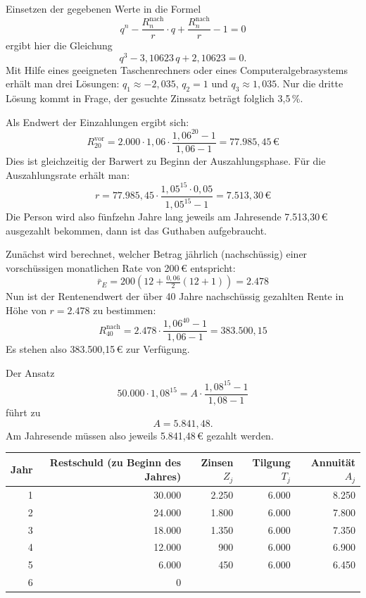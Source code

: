 Einsetzen der gegebenen Werte in die Formel
\[ q^n - \frac{R_n^{\text{nach}}}{r} \cdot q + \frac{R_n^{\text{nach}}}{r} - 1 = 0 \]
ergibt hier die Gleichung
\[ q^3 - 3{,}10623\,q + 2{,}10623 = 0 . \]
Mit Hilfe eines geeigneten Taschenrechners oder eines Computeralgebrasystems erhält man drei Lösungen: $q_1 \approx -2{,}035$, $q_2 = 1$ und $q_3 \approx 1{,}035$. Nur die dritte Lösung kommt in Frage, der gesuchte Zinssatz beträgt folglich 3{,}5\,\%.

Als Endwert der Einzahlungen ergibt sich:
\[ R_{20}^{\text{vor}} = 2.000 \cdot 1{,}06 \cdot \frac{1{,}06^{20} - 1}{1{,}06 - 1} = 77.985{,}45\,€ \]
Dies ist gleichzeitig der Barwert zu Beginn der Auszahlungsphase. Für die Auszahlungsrate erhält man:
\[ r = 77.985{,}45 \cdot \frac{1{,}05^{15} \cdot 0{,}05}{1{,}05^{15} - 1} = 7.513{,}30\,€ \]
Die Person wird also fünfzehn Jahre lang jeweils am Jahresende 7.513{,}30\,€ ausgezahlt bekommen, dann ist das Guthaben aufgebraucht.

Zunächst wird berechnet, welcher Betrag jährlich (nachschüssig) einer vorschüssigen monatlichen Rate von 200\,€ entspricht:
\[ \bar{r}_E = 200 \left(12 + \tfrac{0{,}06}{2}(12 + 1)\right) = 2.478 \]
Nun ist der Rentenendwert der über 40 Jahre nachschüssig gezahlten Rente in Höhe von $r = 2.478$ zu bestimmen:
\[ R_{40}^{\text{nach}} = 2.478 \cdot \frac{1{,}06^{40} - 1}{1{,}06 - 1} = 383.500{,}15 \]
Es stehen also 383.500{,}15\,€ zur Verfügung.

Der Ansatz
\[ 50.000 \cdot 1{,}08^{15} = A \cdot \frac{1{,}08^{15} - 1}{1{,}08 - 1} \]
führt zu
\[ A = 5.841{,}48 . \]
Am Jahresende müssen also jeweils 5.841{,}48\,€ gezahlt werden.

\begin{center}
  \centering
  \begin{tabular}{rrrrr}
    \hline
    Jahr & Restschuld (zu Beginn des Jahres) & Zinsen $Z_j$ & Tilgung $T_j$ & Annuität $A_j$\\
    \hline
    1 & 30.000 & 2.250 & 6.000 & 8.250\\
    2 & 24.000 & 1.800 & 6.000 & 7.800\\
    3 & 18.000 & 1.350 & 6.000 & 7.350\\
    4 & 12.000 & 900 & 6.000 & 6.900\\
    5 & 6.000 & 450 & 6.000 & 6.450\\
    6 & 0 & & & \\
    \hline
  \end{tabular}
\end{center}


